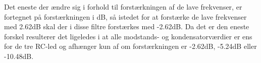 \noindent
%
Det eneste der ændre sig i forhold til forstærkningen af de lave frekvenser, er fortegnet på forstærkningen i dB, så istedet for at forstærke de lave frekvenser med 2.62dB skal der i disse filtre forstærkes med -2.62dB. Da det er den eneste forskel resulterer det ligeledes i at alle modstands- og kondensatorværdier er ens for de tre RC-led og afhænger kun af om forstærkningen er -2.62dB, -5.24dB eller -10.48dB.
%
\newpage
\noindent
%